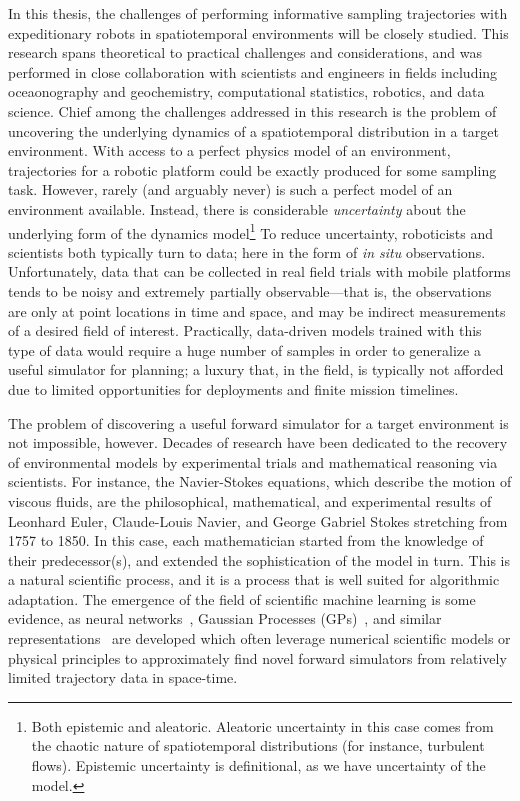 In this thesis, the challenges of performing informative sampling trajectories with expeditionary robots in spatiotemporal environments will be closely studied. 
This research spans theoretical to practical challenges and considerations, and was performed in close collaboration with scientists and engineers in fields including oceaonography and geochemistry, computational statistics, robotics, and data science.
Chief among the challenges addressed in this research is the problem of uncovering the underlying dynamics of a spatiotemporal distribution in a target environment.
With access to a perfect physics model of an environment, trajectories for a robotic platform could be exactly produced for some sampling task.
However, rarely (and arguably never) is such a perfect model of an environment available.
Instead, there is considerable \emph{uncertainty} about the underlying form of the dynamics model\footnote{Both epistemic and aleatoric. Aleatoric uncertainty in this case comes from the chaotic nature of spatiotemporal distributions (for instance, turbulent flows). Epistemic uncertainty is definitional, as we have uncertainty of the model.}
To reduce uncertainty, roboticists and scientists both typically turn to data; here in the form of \emph{in situ} observations.
Unfortunately, data that can be collected in real field trials with mobile platforms tends to be noisy and extremely partially observable---that is, the observations are only at point locations in time and space, and may be indirect measurements of a desired field of interest. 
Practically, data-driven models trained with this type of data would require a huge number of samples in order to generalize a useful simulator for planning; a luxury that, in the field, is typically not afforded due to limited opportunities for deployments and finite mission timelines.

The problem of discovering a useful forward simulator for a target environment is not impossible, however.
Decades of research have been dedicated to the recovery of environmental models by experimental trials and mathematical reasoning via scientists.
For instance, the Navier-Stokes equations, which describe the motion of viscous fluids, are the philosophical, mathematical, and experimental results of Leonhard Euler, Claude-Louis Navier, and George Gabriel Stokes stretching from 1757 to 1850. 
In this case, each mathematician started from the knowledge of their predecessor(s), and extended the sophistication of the model in turn.
This is a natural scientific process, and it is a process that is well suited for algorithmic adaptation.
The emergence of the field of scientific machine learning is some evidence, as neural networks~\autocite{raissi2019physics, sapsis2009dynamically, mohan2019compressed}, Gaussian Processes (GPs)~\autocite{raissi2018numerical}, and similar representations~\autocite{kulkarni2019advection, brunton2016discovering} are developed which often leverage numerical scientific models or physical principles to approximately find novel forward simulators from relatively limited trajectory data in space-time.


